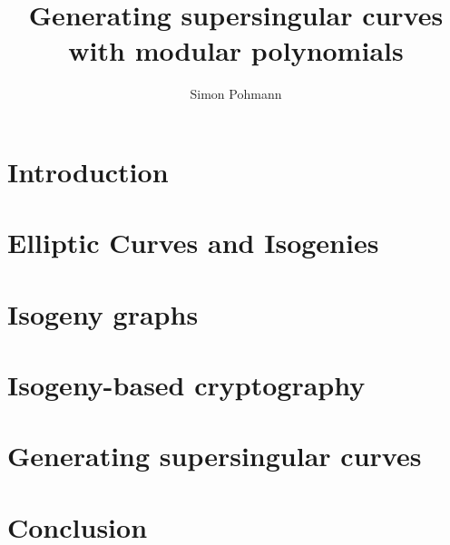 \documentclass{ociamthesis}
\title{Generating supersingular curves with modular polynomials}
\author{Simon Pohmann}
\theoremstyle{definition}
\begin{document}
\maketitle




\begin{romanpages}
    \tableofcontents
\end{romanpages}

\chapter{Introduction}



\chapter{Elliptic Curves and Isogenies}



\chapter{Isogeny graphs}



\chapter{Isogeny-based cryptography}



\chapter{Generating supersingular curves}



\chapter{Conclusion}



\printbibliography
\end{document}
